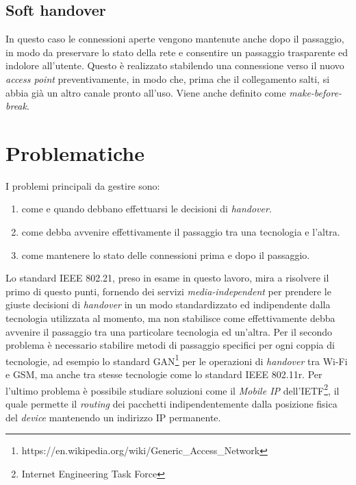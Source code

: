 \subsection{Soft handover}
In questo caso le connessioni aperte vengono mantenute anche dopo il passaggio, in modo da preservare lo stato della rete e consentire un passaggio trasparente ed indolore all'utente. Questo è realizzato stabilendo una connessione verso il nuovo {\em access point} preventivamente, in modo che, prima che il collegamento salti, si abbia già un altro canale pronto all'uso. Viene anche definito come {\em make-before-break}.

\section{Problematiche}
I problemi principali da gestire sono:
\begin{enumerate}
\item come e quando debbano effettuarsi le decisioni di {\em handover}.
\item come debba avvenire effettivamente il passaggio tra una tecnologia e l'altra.
\item come mantenere lo stato delle connessioni prima e dopo il passaggio.
\end{enumerate}
Lo standard IEEE 802.21, preso in esame in questo lavoro, mira a risolvere il primo di questo punti, fornendo dei servizi {\em media-independent} per prendere le giuste decisioni di {\em handover} in un modo standardizzato ed indipendente dalla tecnologia utilizzata al momento, ma non stabilisce come effettivamente debba avvenire il passaggio tra una particolare tecnologia ed un'altra.
Per il secondo problema è necessario stabilire metodi di passaggio specifici per ogni coppia di tecnologie, ad esempio lo standard GAN\footnote{https://en.wikipedia.org/wiki/Generic\_Access\_Network} per le operazioni di {\em handover} tra Wi-Fi e GSM, ma anche tra stesse tecnologie come lo standard IEEE 802.11r.
Per l'ultimo problema è possibile studiare soluzioni come il {\em Mobile IP}\cite{mobileip} dell'IETF\footnote{Internet Engineering Task Force}, il quale permette il {\em routing} dei pacchetti indipendentemente dalla posizione fisica del {\em device} mantenendo un indirizzo IP permanente.
